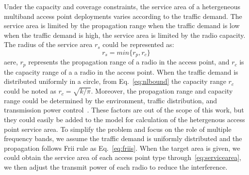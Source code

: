 

Under the capacity and coverage constraints, the service area of a hetergeneous multiband access point deployments
varies according to the traffic demand. The service area is limited by the propagation range when the traffic 
demand is low  when the traffic demand is high, the service area is limited by the radio capacity.
The radius of the service area $r_s$ could be represented as:
\begin{equation}
\label{eq:servicearea}
r_s=min\{r_p,r_c\}
\end{equation}
aere, $r_p$ represents the propagation range of a radio in the access point, and $r_c$ is the capacity range of 
a a radio in the access point. When the traffic demand is distributed uniformly in a circle, from 
Eq.~\ref{eq:nlbound} the capacity range $r_c$ could be noted as $r_c=\sqrt{k/\pi}$. Moreover,
the propagation range and capacity range could be determined by the environment, traffic distribution, and
transmission power control~\cite{robinson2010deploying}. These factors are out of the scope of this work, but they could
easily be added to the model for calculation of the hetergenous access point service area. To simplify the 
problem and focus on the role of multiple frequency bands, we assume the traffic demand is uniformly distributed and the propagation 
follows Frii rule as Eq.~\ref{eq:friis}. When the target area is given, we could obtain the service area of
each access point type through~\ref{eq:servicearea}, we then adjust the transmit power of each radio
to reduce the interference.


